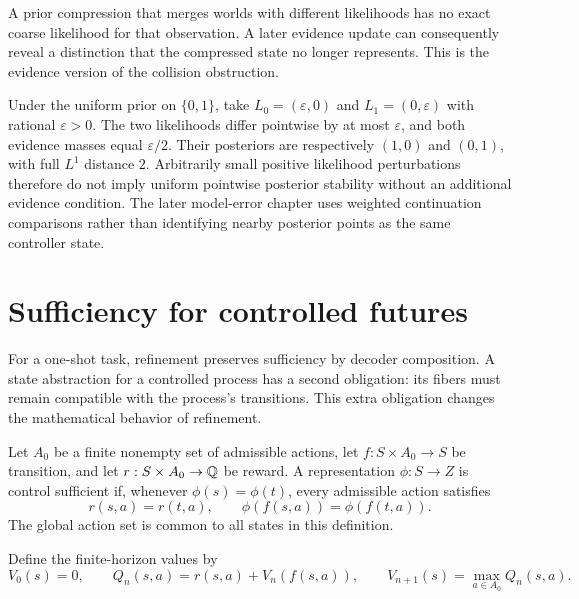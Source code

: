 A prior compression that merges worlds with different likelihoods has no exact coarse likelihood for that observation. A later evidence update can consequently reveal a distinction that the compressed state no longer represents. This is the evidence version of the collision obstruction.

\begin{example}
Under the uniform prior on $\{0,1\}$, take $L_0=(\varepsilon,0)$ and $L_1=(0,\varepsilon)$ with rational $\varepsilon>0$. The two likelihoods differ pointwise by at most $\varepsilon$, and both evidence masses equal $\varepsilon/2$. Their posteriors are respectively $(1,0)$ and $(0,1)$, with full $L^1$ distance $2$. Arbitrarily small positive likelihood perturbations therefore do not imply uniform pointwise posterior stability without an additional evidence condition. The later model-error chapter uses weighted continuation comparisons rather than identifying nearby posterior points as the same controller state.
\end{example}

\section{Sufficiency for controlled futures}
\label{sec:control-sufficiency}

For a one-shot task, refinement preserves sufficiency by decoder composition. A state abstraction for a controlled process has a second obligation: its fibers must remain compatible with the process's transitions. This extra obligation changes the mathematical behavior of refinement.

\begin{definition}
Let $A_0$ be a finite nonempty set of admissible actions, let $f:S\times A_0\to S$ be transition, and let $r:S\times A_0\to\mathbb Q$ be reward. A representation $\phi:S\to Z$ is control sufficient if, whenever $\phi(s)=\phi(t)$, every admissible action satisfies
\[
 r(s,a)=r(t,a),\qquad \phi(f(s,a))=\phi(f(t,a)).
\]
The global action set is common to all states in this definition.
\end{definition}

Define the finite-horizon values by
\[
 V_0(s)=0,\qquad Q_n(s,a)=r(s,a)+V_n(f(s,a)),\qquad
 V_{n+1}(s)=\max_{a\in A_0}Q_n(s,a).
\]

